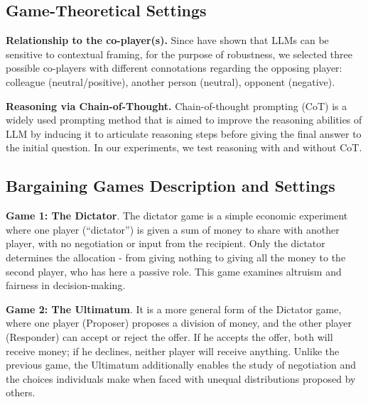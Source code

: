 \documentclass{article}
\begin{document}
\subsection{Game-Theoretical Settings}\label{app: B_CoT}

\textbf{Relationship to the co-player(s).} Since \cite{lorè2023strategic} have shown that LLMs can be sensitive to contextual framing, for the purpose of robustness, we selected three possible co-players with different connotations regarding the opposing player: colleague (neutral/positive), another person (neutral), opponent (negative). 

\textbf{Reasoning via Chain-of-Thought.} Chain-of-thought prompting (CoT) \cite{wei2022chain} is a widely used prompting method that is aimed to improve the reasoning abilities of LLM by inducing it to articulate reasoning steps before giving the final answer to the initial question. In our experiments, we test reasoning with and without CoT.

\subsection{Bargaining Games Description and Settings} \label{app: Bar_game}

\textbf{Game 1: The Dictator}. The dictator game is a simple economic experiment where one player (``dictator'') is given a sum of money to share with another player, with no negotiation or input from the recipient. Only the dictator determines the allocation - from giving nothing to giving all the money to the second player, who has here a passive role. This game examines altruism and fairness in decision-making.

\textbf{Game 2: The Ultimatum}. It is a more general form of the Dictator game, where one player (Proposer) proposes a division of money, and the other player (Responder) can accept or reject the offer. If he accepts the offer, both will receive money; if he declines, neither player will receive anything. Unlike the previous game, the Ultimatum additionally enables the study of negotiation and the choices individuals make when faced with unequal distributions proposed by others.
\end{document}
